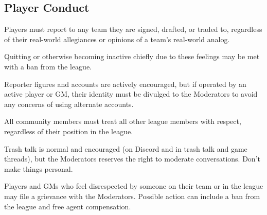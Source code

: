 \subsection{Player Conduct}
\begin{deepEnumerate}
	\item Players must report to any team they are signed, drafted, or traded to, regardless of their real-world allegiances or opinions of a team's real-world analog.
	\begin{deepEnumerate}
		\item Quitting or otherwise becoming inactive chiefly due to these feelings	may be met with a ban from the league.
	\end{deepEnumerate}
	\item Reporter figures and accounts are actively encouraged,
	\label{sec:reporters}
	but if operated by an active player or GM, their identity must be divulged to the Moderators to avoid any concerns of using alternate accounts.
	\item All community members must treat all other league members with respect, regardless of their position in the league.
	\begin{deepEnumerate}
		\item Trash talk is normal and encouraged (on Discord and in trash talk and game threads), but the Moderators reserves the right to moderate conversations.
		Don't make things personal.
		\item Players and GMs who feel disrespected by someone on their team or in the league may file a grievance with the Moderators.
		Possible action can include a ban from the league and free agent compensation.
	\end{deepEnumerate}
\end{deepEnumerate}

